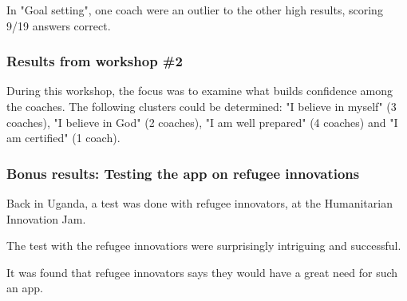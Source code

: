     In "Goal setting", one coach were an outlier to the other high results, scoring 9/19 answers correct.

    \subsubsection{Results from workshop \#2}

    During this workshop, the focus was to examine what builds confidence among the coaches. The following clusters could be determined: "I believe in myself" (3 coaches), "I believe in God" (2 coaches), "I am well prepared" (4 coaches) and "I am certified" (1 coach). 

    \subsubsection{Bonus results: Testing the app on refugee innovations}
    Back in Uganda, a test was done with refugee innovators, at the Humanitarian Innovation Jam.

    The test with the refugee innovatiors were surprisingly intriguing and successful.

    It was found that refugee innovators says they would have a great need for such an app.
